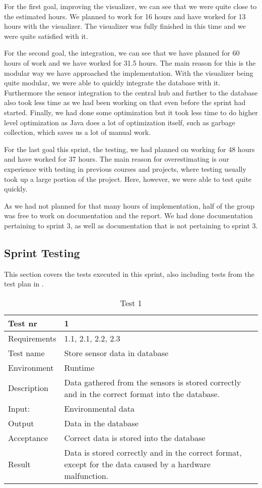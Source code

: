 \documentclass[../document]{subfiles}
\begin{document}
For the first goal, improving the visualizer, we can see that we were quite close to the estimated hours. We planned to work for 16 hours and have worked for 13 hours with the visualizer. The visualizer was fully finished in this time and we were quite satisfied with it.

For the second goal, the integration, we can see that we have planned for 60 hours of work and we have worked for 31.5 hours. The main reason for this is the modular way we have approached the implementation. With the visualizer being quite modular, we were able to quickly integrate the database with it. Furthermore the sensor integration to the central hub and further to the database also took less time as we had been working on that even before the sprint had started. Finally, we had done some optimization but it took less time to do higher level optimization as Java does a lot of optimization itself, such as garbage collection, which saves us a lot of manual work.

For the last goal this sprint, the testing, we had planned on working for 48 hours and have worked for 37 hours. The main reason for overestimating is our experience with testing in previous courses and projects, where testing usually took up a large portion of the project. Here, however, we were able to test quite quickly.

As we had not planned for that many hours of implementation, half of the group was free to work on documentation and the report. We had done documentation pertaining to sprint 3, as well as documentation that is not pertaining to sprint 3.

\subsection{Sprint Testing}
This section covers the tests executed in this sprint, also including tests from the test plan in .

\begin{table}[H]
\caption{Test 1}
\centering
\begin{tabularx}{\textwidth}{|l|X|}
	\hline
	Test nr
	&1
	\\ \hline Requirements
	&1.1, 2.1, 2.2, 2.3
	\\ \hline Test name
	&Store sensor data in database
	\\ \hline Environment
	&Runtime
	\\ \hline Description
	&Data gathered from the sensors is stored correctly and in the correct format into the database.
	\\ \hline Input:
	&Environmental data
	\\ \hline Output
	&Data in the database
	\\ \hline Acceptance
	&Correct data is stored into the database
	\\ \hline Result
	&Data is stored correctly and in the correct format, except for the data caused by a hardware malfunction.
	\\ \hline 
\end{tabularx}
\end{table}
\end{document}
